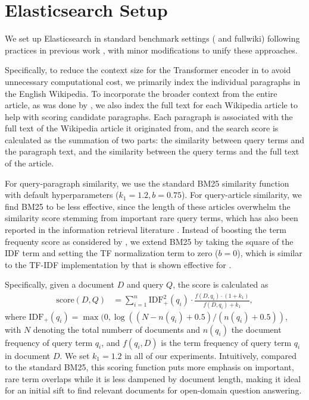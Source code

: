 \section{Elasticsearch Setup} \label{sec:search_engine}

We set up Elasticsearch in standard benchmark settings (\squadopen{} and \hotpotqa{} fullwiki) following practices in previous work \citep{chen2017reading, qi2019answering}, with minor modifications to unify these approaches.

Specifically, to reduce the context size for the Transformer encoder in \irrr{} to avoid unnecessary computational cost, we primarily index the individual paragraphs in the English Wikipedia.
To incorporate the broader context from the entire article, as was done by \citet{chen2017reading}, we also index the full text for each Wikipedia article to help with scoring candidate paragraphs.
Each paragraph is associated with the full text of the Wikipedia article it originated from, and the search score is calculated as the summation of two parts: the similarity between query terms and the paragraph text, and the similarity between the query terms and the full text of the article.

For query-paragraph similarity, we use the standard BM25 similarity function \citep{robertson1995okapi} with default hyperparameters ($k_1=1.2, b=0.75$).
For query-article similarity, we find BM25 to be less effective, since the length of these articles overwhelm the similarity score stemming from important rare query terms, which has also been reported in the information retrieval literature \citep{lv2011documents}.
Instead of boosting the term frequenty score as considered by \citet{lv2011documents}, we extend BM25 by taking the square of the IDF term and setting the TF normalization term to zero ($b=0$), which is similar to the TF-IDF implementation by \citet{chen2017reading} that is shown effective for \squadopen{}.

Specifically, given a document $D$ and query $Q$, the score is calculated as
\begin{align}
    \mathrm{score}(D, Q) &= \sum_{i=1}^n \mathrm{IDF}_+^2(q_i) \cdot \frac{f(D, q_i) \cdot (1 + k_1)}{f(D, q_i) + k_1},
\end{align}
where $\mathrm{IDF}_+(q_i) = \max(0, \log((N-n(q_i) + 0.5) / (n(q_i) + 0.5))$, with $N$ denoting the total numberr of documents and $n(q_i)$ the document frequency of query term $q_i$, and $f(q_i, D)$ is the term frequency of query term $q_i$ in document $D$.
We set $k_1 = 1.2$ in all of our experiments.
Intuitively, compared to the standard BM25, this scoring function puts more emphasis on important, rare term overlaps while it is less dampened by document length, making it ideal for an initial sift to find relevant documents for open-domain question answering.


